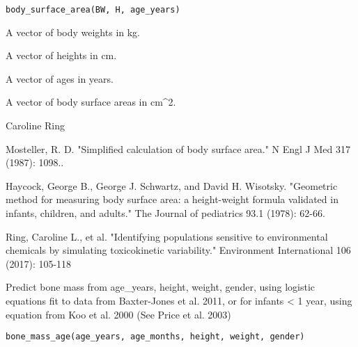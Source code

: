 \documentclass[a4paper]{book}
\begin{document}
%
\begin{Usage}
\begin{verbatim}
body_surface_area(BW, H, age_years)
\end{verbatim}
\end{Usage}
%
\begin{Arguments}
\begin{ldescription}
\item[\code{BW}] A vector of body weights in kg.

\item[\code{H}] A vector of heights in cm.

\item[\code{age\_years}] A vector of ages in years.
\end{ldescription}
\end{Arguments}
%
\begin{Value}
A vector of body surface areas in cm\textasciicircum{}2.
\end{Value}
%
\begin{Author}\relax
Caroline Ring
\end{Author}
%
\begin{References}\relax
Mosteller, R. D. "Simplified calculation of body surface area." 
N Engl J Med 317 (1987): 1098..

Haycock, George B., George J. Schwartz, and David H. Wisotsky. "Geometric 
method for measuring body surface area: a height-weight formula validated in 
infants, children, and adults." The Journal of pediatrics 93.1 (1978): 62-66.

Ring, Caroline L., et al. "Identifying populations sensitive to
environmental chemicals by simulating toxicokinetic variability."
Environment International 106 (2017): 105-118
\end{References}
%
\begin{Description}\relax
Predict bone mass from age\_years, height, weight, gender, using logistic
equations fit to data from Baxter-Jones et al. 2011, or for infants < 1
year, using equation from Koo et al. 2000 (See Price et al. 2003)
\end{Description}
%
\begin{Usage}
\begin{verbatim}
bone_mass_age(age_years, age_months, height, weight, gender)
\end{verbatim}
\end{Usage}
%
\end{document}
